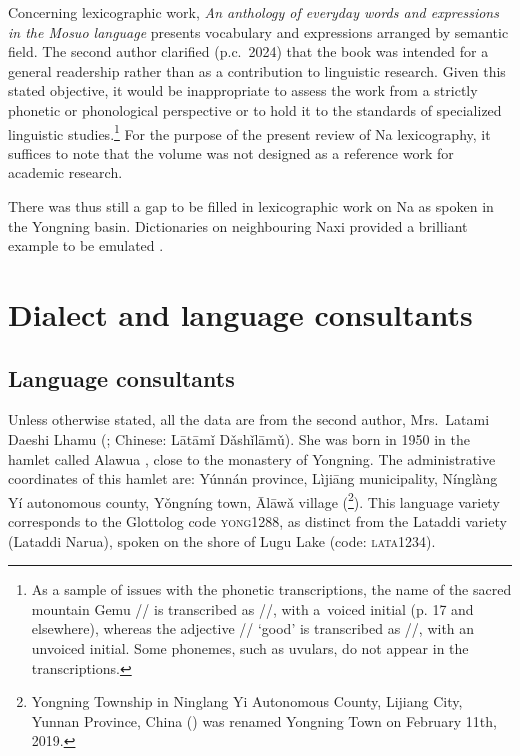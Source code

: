 Concerning lexicographic work, \emph{An anthology of everyday words and expressions in the Mosuo language} \parencite{zhibaetal2013} presents vocabulary and expressions arranged by semantic field. The second author clarified (p.c.\ 2024) that the book was intended for a general readership rather than as a contribution to linguistic research.
Given this stated objective, it would be inappropriate to assess the work from a strictly phonetic or phonological perspective or to hold it to the standards of specialized linguistic studies.\footnote{As a sample of issues with the phonetic transcriptions, the name of the sacred mountain Gemu // is transcribed as //, with a~voiced initial (p. 17 and elsewhere), whereas the adjective // ‘good’ is transcribed as //, with an unvoiced initial. Some phonemes, such as uvulars, do not appear in the transcriptions.} For the purpose of the present review of Na lexicography, it suffices to note that the volume was not designed as a reference work for academic research.

There was thus still a gap to be filled in lexicographic work on Na as spoken in the Yongning basin. Dictionaries on neighbouring Naxi provided a brilliant example to be emulated \parencite{heetal2011,pinsonetal2012}.

\section{Dialect and language consultants}
\label{sec:dialect}

\subsection{Language consultants}
Unless otherwise stated, all the data are from the second author, Mrs.\ Latami Daeshi Lhamu (; Chinese:  Lātāmǐ Dǎshǐlāmǔ). She was born in 1950 in the hamlet called Alawua , close to the monastery of Yongning. The administrative coordinates of this hamlet are: Yúnnán province, Lìjiāng municipality, Nínglàng Yí autonomous county, Yǒngníng town, Ālāwǎ village (\footnote{Yongning Township in Ninglang Yi Autonomous County, Lijiang City, Yunnan Province, China () was renamed Yongning Town  on February 11th, 2019.}). This language variety corresponds to the Glottolog code \textsc{yong1288}, as distinct from the Lataddi variety (Lataddi Narua), spoken on the shore of Lugu Lake (code: \textsc{lata1234}).

